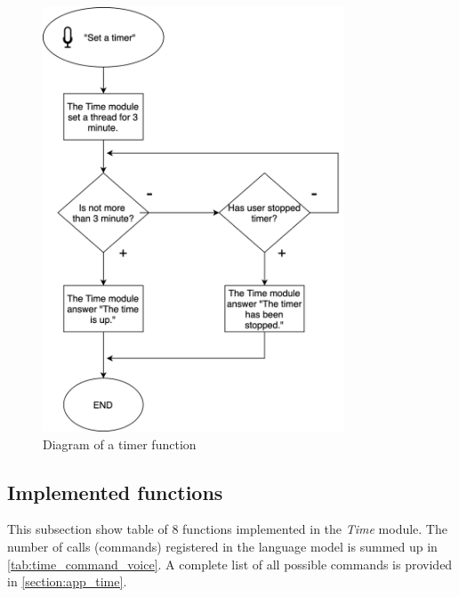 \begin{figure}[H]
    \centering
    \includegraphics[width=0.8\textwidth]{img/timer_time_diagram.png}
    \caption{Diagram of a timer function}
    \label{fig:timer_time_diagram}
\end{figure}
\newpage
\subsection{Implemented functions}

This subsection show table of 8 functions implemented in the \textit{Time} module. The number of calls (commands) registered in the language model is summed up in \cref{tab:time_command_voice}. A complete list of all possible commands is provided in \cref{section:app_time}.


